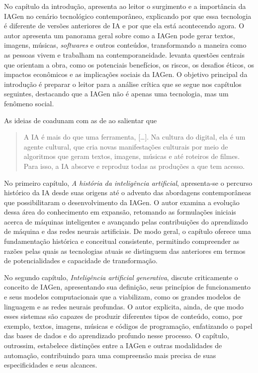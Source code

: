 \documentclass[portuguese]{textolivre}
\begin{document}
No capítulo da introdução, \textcite{kaplan2024generative} apresenta ao leitor o surgimento e a importância da IAGen no cenário tecnológico contemporâneo, explicando por que essa tecnologia é diferente de versões anteriores de IA e por que ela está acontecendo agora. O autor apresenta um panorama geral sobre como a IAGen pode gerar textos, imagens, músicas, \textit{softwares} e outros conteúdos, transformando a maneira como as pessoas vivem e trabalham na contemporaneidade. \textcite{kaplan2024generative} levanta questões centrais que orientam a obra, como os potenciais benefícios, os riscos, os desafios éticos, os impactos econômicos e as implicações sociais da IAGen. O objetivo principal da introdução é preparar o leitor para a análise crítica que se segue nos capítulos seguintes, destacando que a IAGen não é apenas uma tecnologia, mas um fenômeno social.

As ideias de \textcite{kaplan2024generative} coadunam com as de \textcite[p.~146]{kenski2026tempos} ao salientar que

\begin{quote}
    A IA é mais do que uma ferramenta, […]. Na cultura do digital, ela é um agente cultural, que cria novas manifestações culturais por meio de algoritmos que geram textos, imagens, músicas e até roteiros de filmes. Para isso, a IA absorve e reproduz todas as produções a que tem acesso.
\end{quote}

No primeiro capítulo, \textit{A história da inteligência artificial}, apresenta-se o percurso histórico da IA desde suas origens até o advento das abordagens contemporâneas que possibilitaram o desenvolvimento da IAGen. O autor examina a evolução dessa área do conhecimento em expansão, retomando as formulações iniciais acerca de máquinas inteligentes e avançando pelas contribuições do aprendizado de máquina e das redes neurais artificiais. De modo geral, o capítulo oferece uma fundamentação histórica e conceitual consistente, permitindo compreender as razões pelas quais as tecnologias atuais se distinguem das anteriores em termos de potencialidades e capacidade de transformação.

No segundo capítulo, \textit{Inteligência artificial generativa}, \textcite{kaplan2024generative} discute criticamente o conceito de IAGen, apresentando sua definição, seus princípios de funcionamento e seus modelos computacionais que a viabilizam, como os grandes modelos de linguagem e as redes neurais profundas. O autor explicita, ainda, de que modo esses sistemas são capazes de produzir diferentes tipos de conteúdo, como, por exemplo, textos, imagens, músicas e códigos de programação, enfatizando o papel das bases de dados e do aprendizado profundo nesse processo. O capítulo, outrossim, estabelece distinções entre a IAGen e outras modalidades de automação, contribuindo para uma compreensão mais precisa de suas especificidades e seus alcances.
\end{document}
